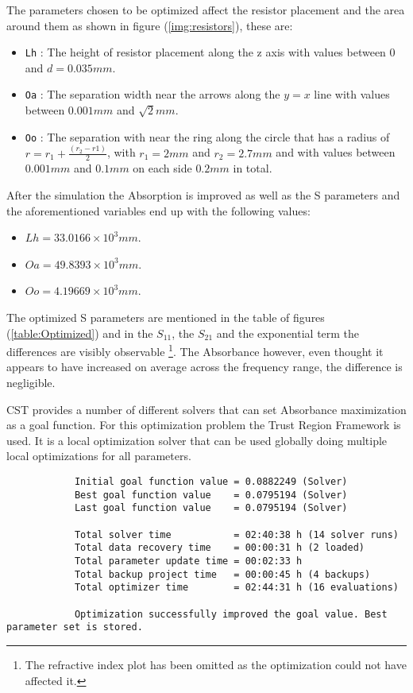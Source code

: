        The parameters chosen to be optimized affect the resistor placement and the area around 
        them as shown in figure (\ref{img:resistors}), these are:
        \begin{itemize}
            \item \texttt{Lh} : The height of resistor placement along the \textsf{z} axis
                with values between 0 and $d=0.035mm$.
            \item \texttt{Oa} : The separation width near the arrows along the $y=x$ line
                with values between $0.001mm$ and $\sqrt{2}mm$.
            \item \texttt{Oo} : The separation with near the ring along the circle that has a 
                radius of $r=r_1+\frac{(r_2-r1)}{2}$, with $r_1=2mm$ and $r_2=2.7mm$ and with 
                values between $0.001mm$ and $0.1mm$ on each side $0.2mm$ in total.
        \end{itemize}
        
        After the simulation the Absorption is improved as well as the S parameters and
        the aforementioned variables end up with the following values:
        \begin{itemize}
            \item $ Lh = 33.0166 \times 10^3 mm $.
            \item $ Oa = 49.8393 \times 10^3 mm $.
            \item $ Oo = 4.19669 \times 10^3 mm $.
        \end{itemize}

        The optimized S parameters are mentioned in the table of figures (\ref{table:Optimized})
        and in the $S_{11}$, the $S_{21}$ and the exponential term the differences are visibly
        observable \footnote{The refractive index plot has been omitted as the optimization could not 
        have affected it.}. The Absorbance however, even thought it appears to have increased on 
        average across the frequency range, the difference is negligible.

        CST provides a number of different solvers that can set Absorbance maximization as a goal
        function. For this optimization problem the \textsf{Trust Region Framework} is used. It is
        a local optimization solver that can be used globally doing multiple local optimizations for
        all parameters.

        \begin{verbatim}
            Initial goal function value = 0.0882249 (Solver)
            Best goal function value    = 0.0795194 (Solver)
            Last goal function value    = 0.0795194 (Solver)

            Total solver time           = 02:40:38 h (14 solver runs)
            Total data recovery time    = 00:00:31 h (2 loaded)
            Total parameter update time = 00:02:33 h
            Total backup project time   = 00:00:45 h (4 backups)
            Total optimizer time        = 02:44:31 h (16 evaluations)

            Optimization successfully improved the goal value. Best parameter set is stored.
        \end{verbatim}

